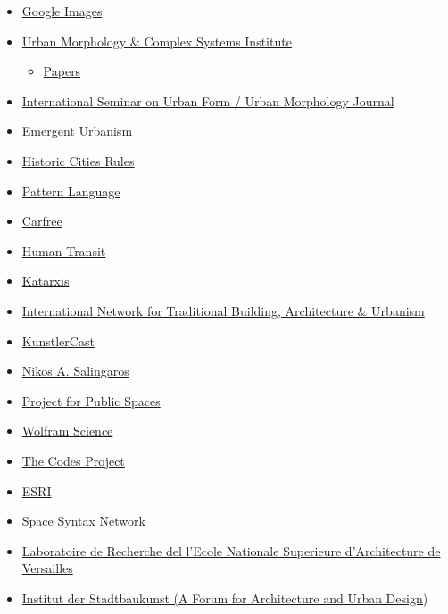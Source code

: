 \documentclass[]{article}
\begin{document}
\begin{itemize}
\itemsep1pt\parskip0pt
\item
  \href{https://www.google.com.co/search?q=urban+morphology\&espv=2\&biw=1018\&bih=557\&tbm=isch\&tbo=u\&source=univ\&sa=X\&ei=aEavU_2GE8Ss0QXk-oDoAg\&ved=0CDUQsAQ}{Google
  Images}
\item
  \href{http://www.urbanmorphologyinstitute.org/}{Urban Morphology \&
  Complex Systems Institute}

  \begin{itemize}
  \itemsep1pt\parskip0pt
  \item
    \href{http://www.urbanmorphologyinstitute.org/research/papers/}{Papers}
  \end{itemize}
\item
  \href{http://urbanmorphology.org/}{International Seminar on Urban Form
  / Urban Morphology Journal}
\item
  \href{http://emergenturbanism.com/}{Emergent Urbanism}
\item
  \href{http://historiccitiesrules.com/}{Historic Cities Rules}
\item
  \href{http://www.patternlanguage.com/}{Pattern Language}
\item
  \href{http://carfree.com/}{Carfree}
\item
  \href{http://www.humantransit.org/}{Human Transit}
\item
  \href{http://katarxis3.com/}{Katarxis}
\item
  \href{http://intbau.org/}{International Network for Traditional
  Building, Architecture \& Urbanism}
\item
  \href{http://kunstlercast.com/}{KunstlerCast}
\item
  \href{http://zeta.math.utsa.edu/~yxk833/}{Nikos A. Salingaros}
\item
  \href{http://www.pps.org/}{Project for Public Spaces}
\item
  \href{http://wolframscience.com/}{Wolfram Science}
\item
  \href{http://codesproject.asu.edu/}{The Codes Project}
\item
  \href{http://www.esri.com/software/cityengine}{ESRI}
\item
  \href{http://www.spacesyntax.net/}{Space Syntax Network}
\item
  \href{http://leav.versailles.archi.fr/\#/equipes-de-recherche/axes-de-recherche-2014-2019/\%C3\%A9nergie-climat-environnement}{Laboratoire
  de Recherche del l'Ecole Nationale Superieure d'Architecture de
  Versailles}
\item
  \href{http://www.stadtbaukunst.org/english/institute/index.html}{Institut
  der Stadtbaukunst (A Forum for Architecture and Urban Design)}


\end{itemize}
\end{document}
